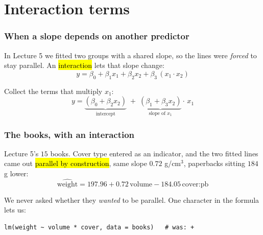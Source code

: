 \documentclass[slidestop,compress,mathserif]{beamer}
\begin{document}
\section{Interaction terms}
\begin{frame}
\frametitle{When a slope depends on another predictor}

In Lecture 5 we fitted two groups with a shared slope, so the lines were \emph{forced} to stay parallel. An \hl{interaction} lets that slope change:
$$y = \beta_0 + \beta_1 x_1 + \beta_2 x_2 + \beta_3\,(x_1 \cdot x_2)$$

\pause
\vspace{0.3em}
Collect the terms that multiply $x_1$:
$$y = \underbrace{(\beta_0 + \beta_2 x_2)}_{\text{intercept}} \;+\; \underbrace{(\beta_1 + \beta_3 x_2)}_{\text{slope of } x_1} \cdot\, x_1$$

\pause
\vspace{0.3em}

\end{frame}


\begin{frame}[fragile]
\frametitle{The books, with an interaction}

Lecture 5's $15$ books. Cover type entered as an indicator, and the two fitted lines came out \hl{parallel by construction}, same slope $0.72$ g/cm$^3$, paperbacks sitting $184$ g lower:
$$\widehat{\text{weight}} = 197.96 + 0.72\,\text{volume} - 184.05\,\text{cover:pb}$$

\pause
\vspace{0.3em}
We never asked whether they \emph{wanted} to be parallel. One character in the formula lets us:

\begin{Verbatim}[fontsize=\scriptsize]
lm(weight ~ volume * cover, data = books)   # was: +
\end{Verbatim}

\end{frame}
\end{document}
